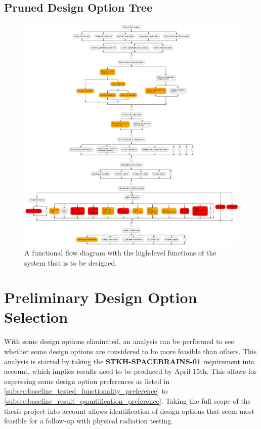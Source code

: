 \subsection{Pruned Design Option Tree}\label{subsec:baseline_pruned_dot}
\begin{figure}[H]
    \centering
    \includegraphics[width=0.6\linewidth]{latex/Images/Diagrams/dot_pruned.png}
    \caption{A functional flow diagram with the high-level functions of the system that is to be designed.}
    \label{fig:baseline_dot_pruned}
\end{figure}


\section{Preliminary Design Option Selection}\label{sec:baseline_preliminary_design_option_selection}
With some design options eliminated, an analysis can be performed to see whether some design options are considered to be more feasible than others. This analysis is started by taking the \textbf{STKH-SPACEBRAINS-01} requirement into account, which implies results need to be produced by April 15th. This allows for expressing some design option preferences as listed in \cref{subsec:baseline_tested_functionality_preference} to \cref{subsec:baseline_result_quantification_preference}. Taking the full scope of the thesis project into account allows identification of design options that seem most feasible for a follow-up with physical radiation testing.

